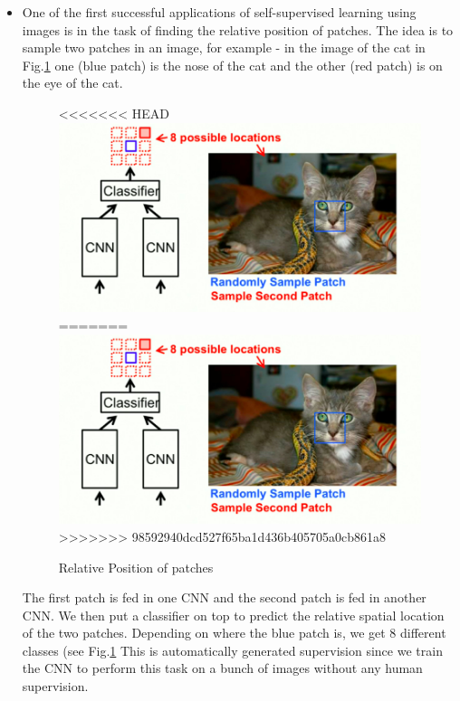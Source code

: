 \begin{itemize}
    
\item One of the first successful applications of self-supervised learning using images is in the task of finding the relative position of patches. The idea is to sample two patches in an image, for example - in the image of the cat in Fig.\ref{fig:1} one (blue patch) is the nose of the cat and the other (red patch) is on the eye of the cat. 

\begin{figure}[h!]
<<<<<<< HEAD
  \includegraphics[width=\linewidth]{RelativePosition.jpg}
=======
  \includegraphics[width=\linewidth]{lectures/13/RelativePosition.jpg}
>>>>>>> 98592940dcd527f65ba1d436b405705a0cb861a8
  \caption{Relative Position of patches}
  \label{fig:1}
\end{figure}

The first patch is fed in one CNN and the second patch is fed in another CNN. We then put a classifier on top to predict the relative spatial location of the two patches. Depending on where the blue patch is, we get 8 different classes (see Fig.\ref{fig:1} This is automatically generated supervision since we train the CNN to perform this task on a bunch of images without any human supervision.


\end{itemize}
